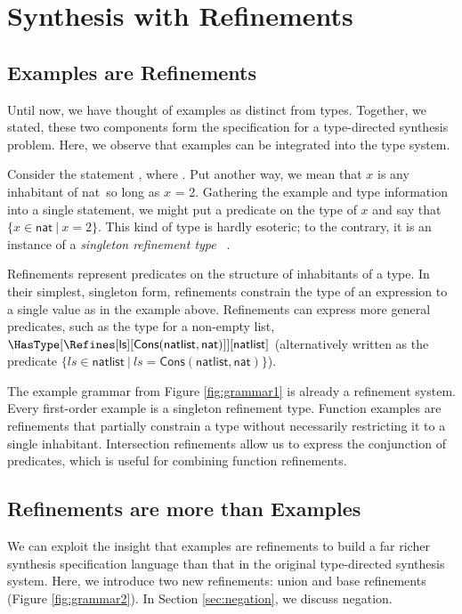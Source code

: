 \section{Synthesis with Refinements}
\label{sec:refinements}

\subsection{Examples are Refinements}

Until now, we have thought of examples as distinct from types.  Together, we stated,
these two components form the specification for a type-directed synthesis problem.
Here, we observe that examples can be integrated into the type system.

Consider the statement \Refines[x][2], where .  Put another way, we mean
that $x$ is any inhabitant of \textsf{nat}~so long as $x$ = 2.  Gathering the example and type
information into a single statement, we might put a predicate on the type of $x$ and say that
$\{x \in \mathsf{nat}~|~x = 2\}$.  This kind of type is hardly esoteric;
to the contrary, it is an instance of a \emph{singleton refinement type}
~\cite{pfenning-refinements}.

Refinements represent predicates on the structure of inhabitants of a type. 
In their simplest, singleton form, refinements constrain the type of an expression
to a single value as in the example above.  Refinements can express more general predicates,
such as the type for a non-empty list, $\mathsf{\HasType[\Refines[ls][Cons(natlist, nat)]][natlist]}$
(alternatively written as the predicate
$\{ls \in \mathsf{natlist}~|~ls = \mathsf{Cons(natlist, nat)}\}$).

The example grammar from Figure \ref{fig:grammar1} is already a refinement system.  Every
first-order example is a singleton refinement type.  Function examples are refinements
that partially constrain a type without necessarily restricting it to a single inhabitant.
Intersection refinements allow us to express the conjunction of predicates, which is useful for
combining function refinements.

\subsection{Refinements are more than Examples}

We can exploit the insight that examples are refinements to build a far richer synthesis
specification language than that in the original type-directed synthesis system. 
Here, we introduce two new refinements: union and base refinements
(Figure \ref{fig:grammar2}).  In Section \ref{sec:negation}, we discuss negation.

